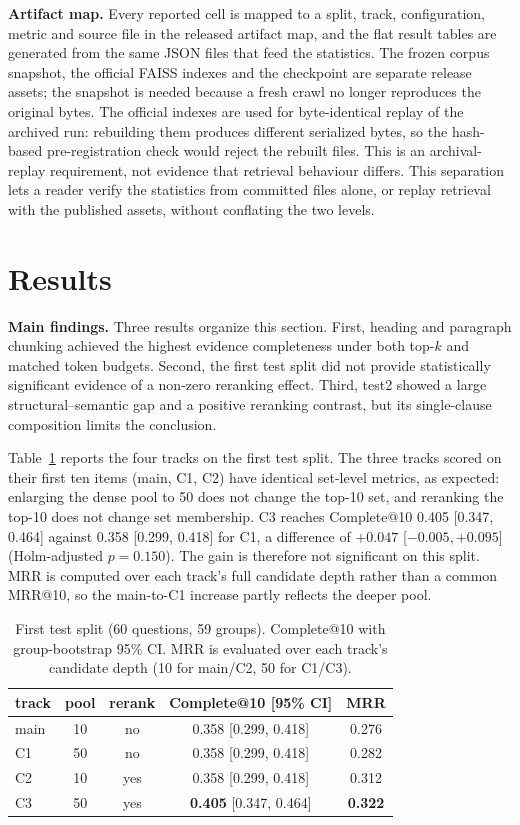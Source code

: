 \documentclass[conference]{IEEEtran}
\begin{document}
\textbf{Artifact map.}
Every reported cell is mapped to a split, track, configuration, metric and source file in the released artifact map, and the flat result tables are generated from the same JSON files that feed the statistics. The frozen corpus snapshot, the official FAISS indexes and the checkpoint are separate release assets; the snapshot is needed because a fresh crawl no longer reproduces the original bytes. The official indexes are used for byte-identical replay of the archived run: rebuilding them produces different serialized bytes, so the hash-based pre-registration check would reject the rebuilt files. This is an archival-replay requirement, not evidence that retrieval behaviour differs. This separation lets a reader verify the statistics from committed files alone, or replay retrieval with the published assets, without conflating the two levels.

\section{Results}
\textbf{Main findings.} Three results organize this section. First, heading and paragraph chunking achieved the highest evidence completeness under both top-$k$ and matched token budgets. Second, the first test split did not provide statistically significant evidence of a non-zero reranking effect. Third, test2 showed a large structural--semantic gap and a positive reranking contrast, but its single-clause composition limits the conclusion.

Table~\ref{tab:test} reports the four tracks on the first test split. The three tracks scored on their first ten items (main, C1, C2) have identical set-level metrics, as expected: enlarging the dense pool to 50 does not change the top-10 set, and reranking the top-10 does not change set membership. C3 reaches Complete@10 0.405 [0.347, 0.464] against 0.358 [0.299, 0.418] for C1, a difference of $+0.047$ [$-0.005,+0.095$] (Holm-adjusted $p=0.150$). The gain is therefore not significant on this split. MRR is computed over each track's full candidate depth rather than a common MRR@10, so the main-to-C1 increase partly reflects the deeper pool.

\begin{table}[t]
\centering
\caption{First test split (60 questions, 59 groups). Complete@10 with group-bootstrap 95\% CI. MRR is evaluated over each track's candidate depth (10 for main/C2, 50 for C1/C3).}
\label{tab:test}
\small
\begin{tabular}{lcccc}
\toprule
track & pool & rerank & Complete@10 [95\% CI] & MRR\\
\midrule
main & 10 & no & 0.358 [0.299, 0.418] & 0.276\\
C1 & 50 & no & 0.358 [0.299, 0.418] & 0.282\\
C2 & 10 & yes & 0.358 [0.299, 0.418] & 0.312\\
C3 & 50 & yes & \textbf{0.405} [0.347, 0.464] & \textbf{0.322}\\
\bottomrule
\end{tabular}
\end{table}
\end{document}
